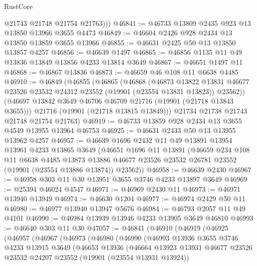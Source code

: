 \begin{lexlean}{RustCore}
\begin{coremodule}
          @21743
          @21748
          @21754
          @21763)))
@46841 := @46733 @13809 @2435 @923 @13 @13850 @13966 @3655 @4473
@46849 := @46604 @2426 @928 @2434 @13 @13850 @13859 @3655 @13966
@46855 := @46631 @2425 @50 @13 @13850 @13857 @4257
@46856 := @46639 @1497
@46865 := @46856 @1135 @11 @49 @13836 @13849 @13856 @4233 @13814 @3649
@46867 := @46651 @1497 @11
@46868 := @46867 @13836
@46873 := @46659 @46 @108 @11 @6638 @4485
@46910 := @46849
    (@46855
      (@46865
        (@46868
          (@46873
            @13822
            @13831
            @46677
            @23526
            @23532
            @24312
            @23552
            (@19901 (@23554 @13831 @13823))
            @23562))
        (@46697 @13842 @3649 @46706 @46709 @21716 (@19901 (@21718 @13843 @3655)))
        @21716
        (@19901 (@21718 @13815 @13849)))
      @21734
      @21738
      @21743
      @21748
      @21754
      @21763)
@46919 := @46733 @13859 @928 @2434 @13 @3655 @4549 @13955 @13964 @46753
@46925 := @46631 @2433 @50 @13 @13955 @13962 @4257
@46957 := @46639
    @1696
    @2432
    @11
    @49
    @13891
    @13954
    @13961
    @4233
    @13865
    @3649
    (@46651
      @1696
      @11
      @13891
      (@46659
        @234
        @108
        @11
        @6638
        @4485
        @13873
        @13886
        @46677
        @23526
        @23532
        @26781
        @23552
        (@19901 (@23554 @13886 @13874))
        @23562))
@46958 := @46639 @2430
@46967 := @46958 @303 @11 @30 @13951 @3655 @3746 @4233 @13897 @3649
@46969 := @25394 @46024 @4547
@46971 := @46969 @2430 @11
@46973 := @46971 @13940 @13949
@46974 := @46630 @1204
@46977 := @46974 @2429 @50 @11
@46980 := @46977 @13940 @13947 @5676
@46984 := @46793 @2057 @11 @49 @4101
@46990 := @46984 @13939 @13946 @4233 @13905 @3649 @46810
@46993 := @46640 @303 @11 @30
@47057 := @46841
    (@46910
      (@46919
        (@46925
          (@46957
            (@46967
              (@46973
                (@46980
                  (@46990
                    (@46993
                      @13936
                      @3655
                      @3746
                      @4233
                      @13915
                      @3649
                      (@46653
                        @13936
                        (@46664
                          @13923
                          @13931
                          @46677
                          @23526
                          @23532
                          @24207
                          @23552
                          (@19901 (@23554 @13931 @13924))

\end{coremodule}
\end{lexlean}
